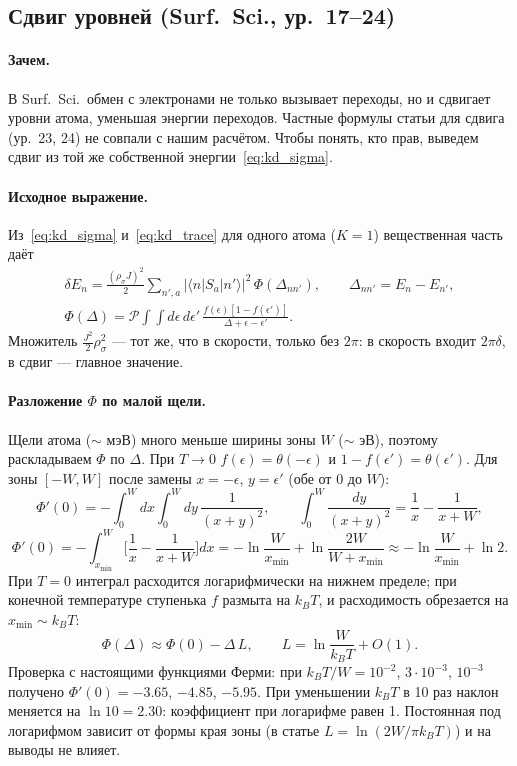 
\subsection{Сдвиг уровней (Surf.\ Sci., ур.~17--24)}
\label{sec:kd_shift}

\paragraph{Зачем.} В Surf.\ Sci.\ обмен с электронами не только вызывает
переходы, но и сдвигает уровни атома, уменьшая энергии переходов. Частные
формулы статьи для сдвига (ур.~23, 24) не совпали с нашим расчётом. Чтобы
понять, кто прав, выведем сдвиг из той же собственной
энергии~\eqref{eq:kd_sigma}.

\paragraph{Исходное выражение.} Из~\eqref{eq:kd_sigma} и~\eqref{eq:kd_trace} для
одного атома ($K=1$) вещественная часть даёт
\begin{gather*}
\delta E_n=\frac{(\rho_\sigma J)^2}{2}\sum_{n',a}|\langle n|S_a|n'\rangle|^2\,
\Phi(\Delta_{nn'}),\qquad \Delta_{nn'}=E_n-E_{n'},\\
\Phi(\Delta)=\mathcal P\!\int\!\!\int d\epsilon\,d\epsilon'\,
\frac{f(\epsilon)[1-f(\epsilon')]}{\Delta+\epsilon-\epsilon'} .
\end{gather*}
Множитель $\tfrac{J^2}{2}\rho_\sigma^2$ --- тот же, что в скорости, только без $2\pi$:
в скорость входит $2\pi\delta$, в сдвиг --- главное значение.

\paragraph{Разложение $\Phi$ по малой щели.} Щели атома ($\sim$ мэВ) много меньше
ширины зоны $W$ ($\sim$ эВ), поэтому раскладываем $\Phi$ по $\Delta$. При $T\to0$
$f(\epsilon)=\theta(-\epsilon)$ и $1-f(\epsilon')=\theta(\epsilon')$. Для зоны $[-W,W]$ после замены
$x=-\epsilon$, $y=\epsilon'$ (обе от 0 до $W$):
\[
\Phi'(0)=-\int_0^W\!dx\int_0^W\!dy\,\frac{1}{(x+y)^2},\qquad
\int_0^W\frac{dy}{(x+y)^2}=\frac1x-\frac1{x+W},
\]
\[
\Phi'(0)=-\int_{x_{\min}}^{W}\Big[\frac1x-\frac1{x+W}\Big]dx
=-\ln\frac{W}{x_{\min}}+\ln\frac{2W}{W+x_{\min}}\approx-\ln\frac{W}{x_{\min}}+\ln2 .
\]
При $T=0$ интеграл расходится логарифмически на нижнем пределе; при конечной
температуре ступенька $f$ размыта на $k_BT$, и расходимость обрезается на
$x_{\min}\sim k_BT$:
\[
\Phi(\Delta)\approx\Phi(0)-\Delta\,L,\qquad L=\ln\frac{W}{k_BT}+O(1).
\]
Проверка с настоящими функциями Ферми: при $k_BT/W=10^{-2}$, $3\cdot10^{-3}$,
$10^{-3}$ получено $\Phi'(0)=-3.65$, $-4.85$, $-5.95$. При уменьшении $k_BT$ в 10 раз
наклон меняется на $\ln10=2.30$: коэффициент при логарифме равен 1.
Постоянная под логарифмом зависит от формы края зоны (в статье
$L=\ln(2W/\pi k_BT)$) и на выводы не влияет.

